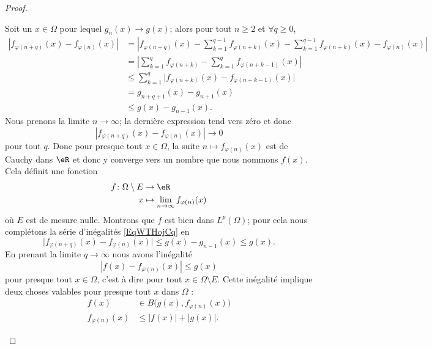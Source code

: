 \begin{proof}
\begin{subproof}
        Soit un \( x\in \Omega\) pour lequel \( g_n(x)\to g(x)\); alors pour tout \( n\geq 2\) et \( \forall q\geq 0\),
        \begin{subequations}    \label{EqWTHojCq}
            \begin{align}
                | f_{\varphi(n+q)}(x)-f_{\varphi(n)}(x) |&=\left| f_{\varphi(n+q)}(x)-\sum_{k=1}^{q-1}f_{\varphi(n+k)}(x) -\sum_{k=1}^{q-1}f_{\varphi(n+k)}(x)-f_{\varphi(n)}(x) \right| \\
                &=\left| \sum_{k=1}^qf_{\varphi(n+k)}-\sum_{k=1}^qf_{\varphi(n+k-1)}(x) \right|\\
                &\leq \sum_{k=1}^q\Big| f_{\varphi(n+k)}(x)-f_{\varphi(n+k-1)}(x) \Big|\\
                &=g_{n+q+1}(x)-g_{n+1}(x)\\
                &\leq g(x)-g_{n-1}(x).
            \end{align}
        \end{subequations}
        Nous prenons la limite \( n\to \infty\); la dernière expression tend vers zéro et donc
        \begin{equation}
            | f_{\varphi(n+q)}(x)-f_{\varphi(n)}(x) |\to 0
        \end{equation}
        pour tout \( q\). Donc pour presque tout \( x\in \Omega\), la suite \( n\mapsto f_{\varphi(n)}(x)\) est de Cauchy dans \( \eR\) et donc y converge vers un nombre que nous nommons \( f(x)\). Cela définit une fonction
        \begin{equation}
            \begin{aligned}
                f\colon \Omega\setminus E&\to \eR \\
                x&\mapsto \lim_{n\to \infty} f_{\varphi(n)}(x) 
            \end{aligned}
        \end{equation}
        où \( E\) est de mesure nulle. Montrons que \( f\) est bien dans \( L^p(\Omega)\); pour cela nous complétons la série d'inégalités \eqref{EqWTHojCq} en
        \begin{equation}
            \big| f_{\varphi(n+q)}(x)-f_{\varphi(n)}(x) \big|\leq g(x)-g_{n-1}(x)\leq g(x).
        \end{equation}
        En prenant la limite \( q\to \infty\) nous avons l'inégalité
        \begin{equation}    \label{EqMQbDRac}
            | f(x)-f_{\varphi(n)}(x) |\leq g(x)
        \end{equation}
        pour presque tout \( x\in\Omega\), c'est à dire pour tout \( x\in\Omega\setminus E\). Cette inégalité implique deux choses valables pour presque tout \( x\) dans \( \Omega\) :
        \begin{subequations}
            \begin{align}
                f(x)&\in B\big( g(x),f_{\varphi(n)}(x) \big)\\
                f_{\varphi(n)}(x)&\leq | f(x) |+| g(x) |.
            \end{align}
        \end{subequations}
        

\end{subproof}
\end{proof}
